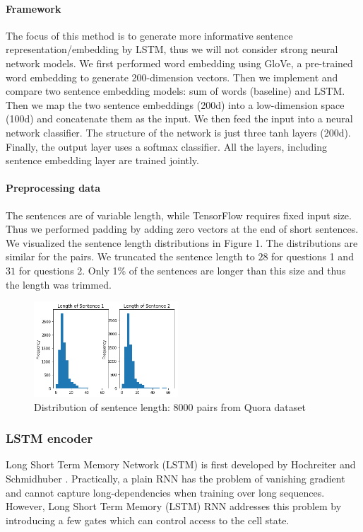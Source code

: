 \documentclass[11pt,a4paper]{article}
\begin{document}
\paragraph{Framework} The focus of this method is to generate more informative sentence representation/embedding by LSTM, thus we will not consider strong neural network models. We first performed word embedding using GloVe\cite{pennington2014glove}, a pre-trained word embedding to generate 200-dimension vectors. Then we implement and compare two sentence embedding models: sum of words (baseline) and LSTM. Then we map the two sentence embeddings (200d) into a low-dimension space (100d) and concatenate them as the input. We then feed the input into a neural network classifier. The structure of the network is just three tanh layers (200d). Finally, the output layer uses a softmax classifier. All the layers, including sentence embedding layer are trained jointly.

\paragraph{Preprocessing data} The sentences are of variable length, while TensorFlow requires fixed input size. Thus we performed padding by adding zero vectors at the end of short sentences.  We visualized the sentence length distributions in Figure 1. The distributions are similar for the pairs. We truncated the sentence length to $28$ for questions 1 and  $31$ for questions 2. Only 1\% of the sentences are longer than this size and thus the length was trimmed.
\begin{figure}[htbp]
\centering
\includegraphics[width=0.48\textwidth]{fig/dist_sent_len.png} 
\caption{Distribution of sentence length: 8000 pairs from Quora dataset}
\end{figure}

\subsubsection{LSTM encoder}
Long Short Term Memory Network (LSTM) is first developed by Hochreiter and Schmidhuber \cite{hochreiter1997long}. Practically, a plain RNN has the problem of vanishing gradient and cannot capture long-dependencies when training over long sequences. However, Long Short Term Memory (LSTM) RNN addresses this problem by introducing a few gates which can control access to the cell state.
\end{document}
